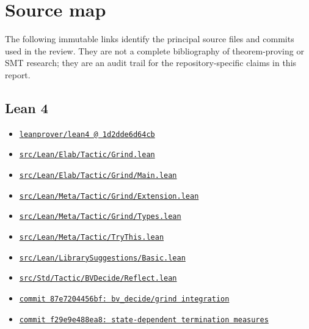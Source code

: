 \documentclass[11pt,letterpaper,openany]{report}
\newcommand{\sourcelink}[2]{\href{#1}{\nolinkurl{#2}}}
\begin{document}
\chapter{Source map}
\label{app:sources}

The following immutable links identify the principal source files and commits used in
the review. They are not a complete bibliography of theorem-proving or SMT research;
they are an audit trail for the repository-specific claims in this report.

\section*{Lean 4}

\begin{itemize}
  \item \sourcelink{https://github.com/leanprover/lean4/tree/1d2dde6d64cb3da989bab118f4d386eb55237fe5}{leanprover/lean4 @ 1d2dde6d64cb}
  \item \sourcelink{https://github.com/leanprover/lean4/blob/1d2dde6d64cb3da989bab118f4d386eb55237fe5/src/Lean/Elab/Tactic/Grind.lean}{src/Lean/Elab/Tactic/Grind.lean}
  \item \sourcelink{https://github.com/leanprover/lean4/blob/1d2dde6d64cb3da989bab118f4d386eb55237fe5/src/Lean/Elab/Tactic/Grind/Main.lean}{src/Lean/Elab/Tactic/Grind/Main.lean}
  \item \sourcelink{https://github.com/leanprover/lean4/blob/1d2dde6d64cb3da989bab118f4d386eb55237fe5/src/Lean/Meta/Tactic/Grind/Extension.lean}{src/Lean/Meta/Tactic/Grind/Extension.lean}
  \item \sourcelink{https://github.com/leanprover/lean4/blob/1d2dde6d64cb3da989bab118f4d386eb55237fe5/src/Lean/Meta/Tactic/Grind/Types.lean}{src/Lean/Meta/Tactic/Grind/Types.lean}
  \item \sourcelink{https://github.com/leanprover/lean4/blob/1d2dde6d64cb3da989bab118f4d386eb55237fe5/src/Lean/Meta/Tactic/TryThis.lean}{src/Lean/Meta/Tactic/TryThis.lean}
  \item \sourcelink{https://github.com/leanprover/lean4/blob/1d2dde6d64cb3da989bab118f4d386eb55237fe5/src/Lean/LibrarySuggestions/Basic.lean}{src/Lean/LibrarySuggestions/Basic.lean}
  \item \sourcelink{https://github.com/leanprover/lean4/blob/1d2dde6d64cb3da989bab118f4d386eb55237fe5/src/Std/Tactic/BVDecide/Reflect.lean}{src/Std/Tactic/BVDecide/Reflect.lean}
  \item \sourcelink{https://github.com/leanprover/lean4/commit/87e7204456bfca901bdc724c996030e13c2f80c6}{commit 87e7204456bf: bv_decide/grind integration}
  \item \sourcelink{https://github.com/leanprover/lean4/commit/f29e9e488ea8242c875806e4b0564820c2d553b2}{commit f29e9e488ea8: state-dependent termination measures}
\end{itemize}
\end{document}
